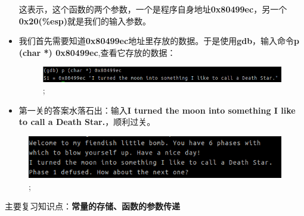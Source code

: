 \begin{itemize}
	这表示，这个函数的两个参数，一个是程序自身地址\textbf{0x80499ec}，另一个\textbf{0x20(\%esp)}就是我们的输入参数。
	
	\item
	我们首先需要知道\textbf{0x80499ec}地址里存放的数据。于是使用\textbf{gdb}，输入命令\textbf{p (char *) 0x80499ec},查看它存放的数据：
	\begin{figure}[h]
		\centering
			\includegraphics[scale=0.7]{images/phase_1_part_1.png};
	\end{figure}
	
	\item
	第一关的答案水落石出：输入\textbf{I turned the moon into something I like to call a Death Star.}，顺利过关。
	\end{itemize}
	
	\begin{figure}[h]
		\centering
			\includegraphics[scale=0.8]{images/phase_1_success.png};
	\end{figure}
	
	主要复习知识点：\textbf{常量的存储、函数的参数传递}
	